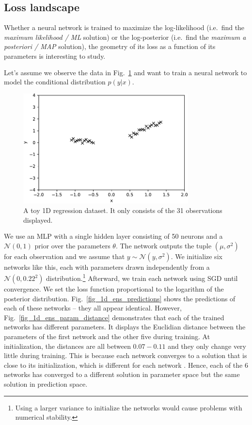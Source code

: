 \documentclass[12pt]{article}
\begin{document}
\subsection{Loss landscape}
\label{sec_loss_landscape}

Whether a neural network is trained to maximize the log-likelihood (i.e.\ find the \textit{maximum likelihood / ML} solution) or the log-posterior (i.e.\ find the \textit{maximum a posteriori / MAP} solution), the geometry of its loss as a function of its parameters is interesting to study.

Let's assume we observe the data in Fig.\ \ref{fig_1d_dataset} and want to train a neural network to model the conditional distribution $p(y | x)$.

\begin{figure}[H]
\centering
\includegraphics[width=9cm]{plots/1d_dataset.pdf}
\caption{A toy 1D regression dataset. It only consists of the 31 observations displayed.}
\label{fig_1d_dataset}
\end{figure}

We use an MLP with a single hidden layer consisting of 50 neurons and a $\mathcal{N}(0, 1)$ prior over the parameters $\theta$. The network outputs the tuple $(\mu, \sigma^2)$ for each observation and we assume that $y \sim \mathcal{N}(y, \sigma^2)$. We initialize six networks like this, each with parameters drawn independently from a $\mathcal{N}(0, 0.22^2)$ distribution.\footnote{Using a larger variance to initialize the networks would cause problems with numerical stability.} Afterward, we train each network using SGD until convergence. We set the loss function proportional to the logarithm of the posterior distribution. Fig.\ \ref{fig_1d_ens_predictions} shows the predictions of each of these networks -- they all appear identical. However, Fig.\ \ref{fig_1d_ens_param_distance} demonstrates that each of the trained networks has different parameters. It displays the Euclidian distance between the parameters of the first network and the other five during training. At initialization, the distances are all between $0.07 - 0.11$ and they only change very little during training. This is because each network converges to a solution that is close to its initialization, which is different for each network \cite{deep_ens, knowledge_distillation}. Hence, each of the 6 networks has converged to a different solution in parameter space but the same solution in prediction space.
\end{document}
